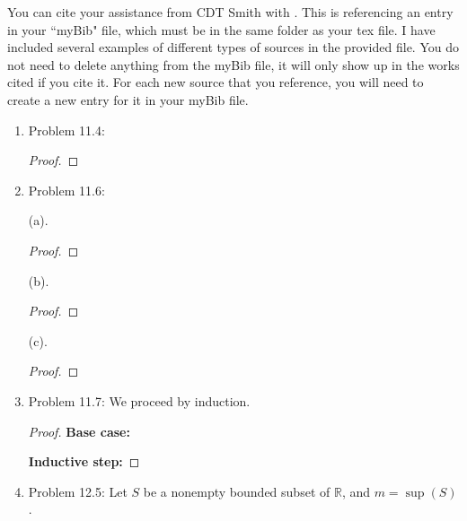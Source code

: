 \documentclass{article}
\begin{document}
\begin{flushleft}	

\renewcommand{\baselinestretch}{1.5}
\def \N {\mathbb{N}}
\def \Z {\mathbb{Z}}
\def \Q {\mathbb{Q}}
\def \R {\mathbb{R}}
\def \C {\mathbb{C}}
\def \Cbar {\overline{\mathbb{C}}}
\def \Chat {\widehat{\mathbb{C}}}
\def \D {\mathbb{D}}
\def \A {\mathcal{A}}
\def \E {\mathcal{E}}
\def \F {\mathcal{F}}
\def \H {\mathcal{H}}
\def \L {\mathcal{L}}
\def \O {\mathcal{O}}
\def \T {\mathcal{T}}
\def \eps {\varepsilon}
\def \epsg {\varepsilon > 0}

\large

You can cite your assistance from CDT Smith with \cite{smith}. This is referencing an entry in your ``myBib" file, which must be in the same folder as your tex file. I have included several examples of different types of sources in the provided file. You do not need to delete anything from the myBib file, it will only show up in the works cited if you cite it. For each new source that you reference, you will need to create a new entry for it in your myBib file.

\begin{enumerate}
	\item Problem 11.4:
	\begin{proof}
		
	\end{proof}

	\item Problem 11.6:
	
	(a).
	\begin{proof}
		
	\end{proof}
	\bigskip
	
	(b).
	\begin{proof}
		
	\end{proof}
	\bigskip
	
	(c).
	\begin{proof}
		
	\end{proof}
	
	\item Problem 11.7: We proceed by induction.
	\bigskip
	
	\begin{proof}
		\textbf{Base case:}
		\bigskip
	
		\textbf{Inductive step:}
	\end{proof}
	
	\item Problem 12.5: Let $S$ be a nonempty bounded subset of $\R$, and $m = \sup(S)$.
	\bigskip
	

\end{enumerate}
\end{flushleft}
\end{document}
